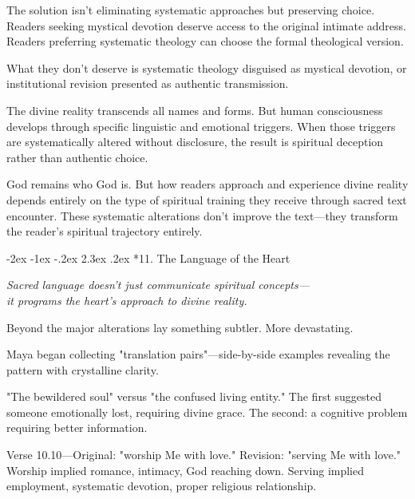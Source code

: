 \documentclass[12pt,twoside]{book}
\makeatletter
\def\cleardoublepage{\clearpage\if@twoside \ifodd\c@page\else\hbox{}\thispagestyle{empty}\newpage\if@twocolumn\hbox{}\newpage\fi\fi\fi}
\renewcommand\section{\@startsection{section}{1}{\z@}%
{-2ex \@plus -1ex \@minus -.2ex}%
{2.3ex \@plus.2ex}%
{\normalfont\Large\bfseries}}
\makeatother
\begin{document}
The solution isn't eliminating systematic approaches but preserving choice. Readers seeking mystical devotion deserve access to the original intimate address. Readers preferring systematic theology can choose the formal theological version.

What they don't deserve is systematic theology disguised as mystical devotion, or institutional revision presented as authentic transmission.

The divine reality transcends all names and forms. But human consciousness develops through specific linguistic and emotional triggers. When those triggers are systematically altered without disclosure, the result is spiritual deception rather than authentic choice.

God remains who God is. But how readers approach and experience divine reality depends entirely on the type of spiritual training they receive through sacred text encounter. These systematic alterations don't improve the text—they transform the reader's spiritual trajectory entirely.


\cleardoublepage
\vspace*{0.20\textheight}
\section*{11. The Language of the Heart}
\thispagestyle{chapterpage}

{\centering\itshape Sacred language doesn't just communicate spiritual concepts—\\it programs the heart's approach to divine reality.\par}
\vspace{0.3cm}

\normalfont\justifying
Beyond the major alterations lay something subtler. More devastating.

Maya began collecting "translation pairs"—side-by-side examples revealing the pattern with crystalline clarity.

"The bewildered soul" versus "the confused living entity." The first suggested someone emotionally lost, requiring divine grace. The second: a cognitive problem requiring better information.

Verse 10.10—Original: "worship Me with love." Revision: "serving Me with love." Worship implied romance, intimacy, God reaching down. Serving implied employment, systematic devotion, proper religious relationship.
\end{document}
